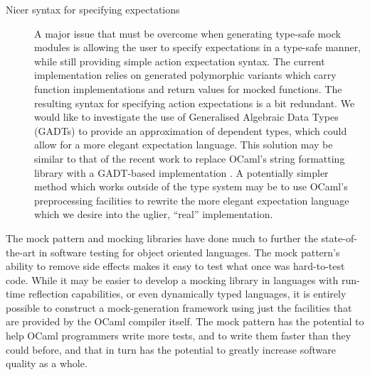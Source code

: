 \begin{description}
\item [Nicer syntax for specifying expectations]

  A major issue that must be overcome when generating type-safe mock
  modules is allowing the user to specify expectations in a type-safe
  manner, while still providing simple action expectation syntax. The
  current implementation relies on generated polymorphic variants
  which carry function implementations and return values for mocked
  functions. The resulting syntax for specifying action expectations
  is a bit redundant. We would like to investigate the use of
  Generalised Algebraic Data Types (GADTs) to provide an approximation
  of dependent types, which could allow for a more elegant expectation
  language. This solution may be similar to that of the recent work to
  replace OCaml's string formatting library with a GADT-based
  implementation \cite{vaugon:gadt-format}. A potentially simpler
  method which works outside of the type system may be to use OCaml's
  preprocessing facilities to rewrite the more elegant expectation
  language which we desire into the uglier, ``real'' implementation.



\end{description}

The mock pattern and mocking libraries have done much to further the
state-of-the-art in software testing for object oriented
languages. The mock pattern's ability to remove side effects makes it
easy to test what once was hard-to-test code. While it may be easier
to develop a mocking library in languages with run-time reflection
capabilities, or even dynamically typed languages, it is entirely
possible to construct a mock-generation framework using just the
facilities that are provided by the OCaml compiler itself. The mock
pattern has the potential to help OCaml programmers write more tests,
and to write them faster than they could before, and that in turn has
the potential to greatly increase software quality as a whole.
